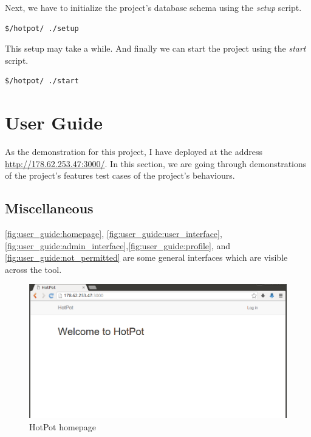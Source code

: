 Next, we have to initialize the project's database schema using the \emph{setup} script.
\begin{lstlisting}[breaklines=false,frame=lt]
$/hotpot/ ./setup
\end{lstlisting}
This setup may take a while. And finally we can start the project using the \emph{start} script.
\begin{lstlisting}[breaklines=false,frame=lt]
$/hotpot/ ./start
\end{lstlisting}


\section{User Guide}
\label{ch:result:user_guide}

As the demonstration for this project, I have deployed \myProject at the address \href{http://178.62.253.47:3000/}{http://178.62.253.47:3000/}.
In this section, we are going through demonstrations of the project's features \ie test cases of the project's behaviours.

\subsection{Miscellaneous}
\label{ch:result:user_guide:miscellaneous}
\autoref{fig:user_guide:homepage}, \autoref{fig:user_guide:user_interface}, \autoref{fig:user_guide:admin_interface},\autoref{fig:user_guide:profile}, and \autoref{fig:user_guide:not_permitted} are some general interfaces which are visible across the tool.

\begin{figure}[bth]                                                                                                                                                  \myfloatalign
\includegraphics[width=1.0\linewidth]{gfx/chapter_5/general/homepage}
\caption[HotPot homepage]{HotPot homepage}
\label{fig:user_guide:homepage}
\end{figure}

